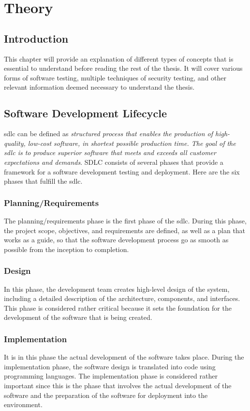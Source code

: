 \chapter{Theory}
\label{chap:Theory}

\section{Introduction}
This chapter will provide an explanation of different types of concepts that is essential to understand before reading the rest of the thesis. It will cover various forms of software testing, multiple techniques of security testing, and other relevant information deemed necessary to understand the thesis.


\section{Software Development Lifecycle}
\acrlong{sdlc} can be defined as \textit{structured process that enables the production of high-quality, low-cost software, in shortest possible production time. The goal of the \acrshort{sdlc} is to produce superior software that meets and exceeds all customer expectations and demands}\cite{sdlc}.  SDLC consists of several phases that provide a framework for a software development testing and deployment. Here are the six phases that fulfill the \acrshort{sdlc}. 

  \subsection{Planning/Requirements} 
 The planning/requirements phase is the first phase of the \acrshort{sdlc}. During this phase, the project scope, objectives, and requirements are defined, as well as a plan that works as a guide, so that the software development process go as smooth as possible from the inception to completion. \cite{PlanningSDLC}
 
 \subsection{Design}
 In this phase, the development team creates high-level design of the system, including a detailed description of the architecture, components, and interfaces. This phase is considered rather critical because it sets the foundation for the development of the software that is being created. \cite{DesignSDLC} 
 
 \subsection{Implementation}
 It is in this phase the actual development of the software takes place. During the implementation phase, the software design is translated into code using programming languages. The implementation phase is considered rather important since this is the phase that involves the actual development of the software and the preparation of the software for deployment into the environment. \cite{ImplementationSDLC}
 
